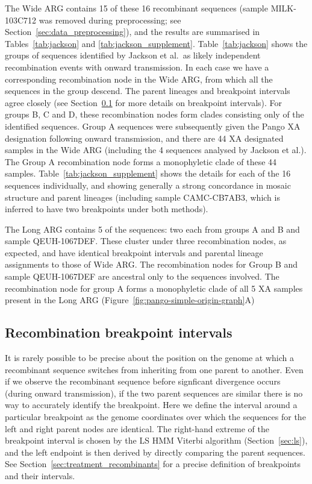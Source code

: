 \documentclass{article}
\begin{document}
The Wide ARG contains 15 of these 16 recombinant sequences
(sample MILK-103C712 was removed during preprocessing; see
Section~\ref{sec:data_preprocessing}), and the results are summarised
in Tables~\ref{tab:jackson} and \ref{tab:jackson_supplement}.
Table~\ref{tab:jackson} shows the groups of sequences identified by Jackson
et al.\ as likely independent recombination events with onward transmission.
In each case we have a corresponding recombination node in the Wide ARG,
from which all the sequences in the group descend. The parent lineages
and breakpoint intervals agree closely (see
Section~\ref{sec:breakpoint_intervals} for more details on breakpoint
intervals).
For groups B, C and D,
these recombination nodes form clades consisting only of the identified
sequences.
Group A sequences were subsequently given the Pango XA designation
following onward transmission,
and there are 44 XA designated samples in the Wide ARG (including the
4 sequences analysed by Jackson et al.). The Group A recombination
node forms a monophyletic clade of these 44 samples.
Table~\ref{tab:jackson_supplement} shows the details for each of the
16 sequences individually, and showing generally a strong concordance
in mosaic structure and parent lineages
(including sample CAMC-CB7AB3, which is inferred to have two breakpoints under both
methods).

The Long ARG contains 5 of the sequences: two each from groups A and B
and sample QEUH-1067DEF. These cluster under three recombination nodes, as expected,
and have identical breakpoint intervals and parental lineage assignments
to those of Wide ARG.
The recombination nodes for Group B and sample QEUH-1067DEF are ancestral only
to the sequences involved.
The recombination node for group A forms a monophyletic clade of all
5 XA samples present in the Long ARG
(Figure~\ref{fig:pango-simple-origin-graph}A)

\subsection{Recombination breakpoint intervals}
\label{sec:breakpoint_intervals}
It is rarely possible to be precise about the position on the genome at which
a recombinant sequence switches from inheriting from one parent to another.
Even if we observe the recombinant sequence before signficant
divergence occurs (during onward transmission), if the two parent sequences
are similar there is no way to
accurately identify the breakpoint.
Here we define the
interval around a particular breakpoint as the genome coordinates over which the
sequences for the left and right parent nodes are identical. The right-hand
extreme of the breakpoint interval is chosen by the LS HMM Viterbi algorithm
(Section~\ref{sec:ls}), and the left endpoint is then derived by directly
comparing the parent sequences. See Section~\ref{sec:treatment_recombinants} for
a precise definition of breakpoints and their intervals.
\end{document}
